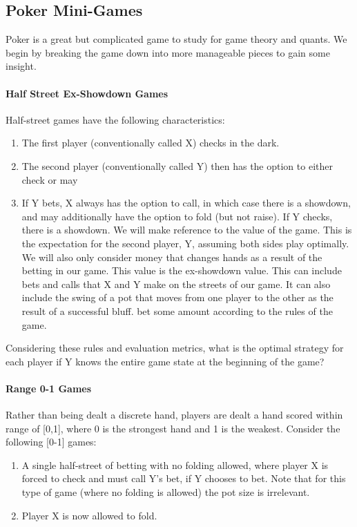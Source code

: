 \documentclass{article}
\begin{document}
\subsection {Poker Mini-Games}
Poker is a great but complicated game to study for game theory and quants. We begin by breaking the game down into more manageable pieces to gain some insight. 

\paragraph{Half Street Ex-Showdown Games}
Half-street games have the following characteristics: 
\begin{enumerate}
    \item The first player (conventionally called X) checks in the dark.
    \item The second player (conventionally called Y) then has the option to either check or may 
    \item If Y bets, X always has the option to call, in which case there is a showdown, and may 
additionally have the option to fold (but not raise). If Y checks, there is a showdown. 
We will make reference to the value of the game. This is the expectation for the second player, 
Y, assuming both sides play optimally. We will also only consider money that changes hands as 
a result of the betting in our game. This value is the ex-showdown value. This can include bets 
and calls that X and Y make on the streets of our game. It can also include the swing of a pot that 
moves from one player to the other as the result of a successful bluff.
bet some amount according to the rules of the game.
\end{enumerate}
Considering these rules and evaluation metrics, what is the optimal strategy for each player if Y knows the entire game state at the beginning of the game?

\paragraph{Range 0-1 Games} 
Rather than being dealt a discrete hand, players are dealt a hand scored within range of [0,1], where 0 is the strongest hand and 1 is the weakest. Consider the following [0-1] games: \newline
\begin{enumerate}
    \item A single half-street of betting with no folding allowed, where player X is forced to check and must call Y's bet, if Y chooses to bet. Note that for this type of game (where no folding is allowed) the pot size is irrelevant.
    \item Player X is now allowed to fold.
\end{enumerate}
\end{document}
